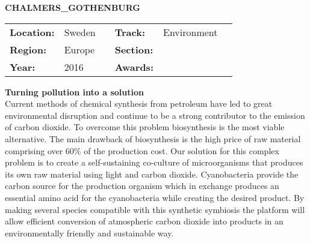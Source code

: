 \textbf{\uppercase{Chalmers\_Gothenburg}} \FloatBarrier \begin{table}[h] \begin{tabular}{lp{2.5cm}llll} \textbf{Location:} & Sweden & \multicolumn{1}{|l}{} & \textbf{Track:}   & Environment \\ \textbf{Region:}   & Europe   & \multicolumn{1}{|l}{} & \textbf{Section:} &  \\ \textbf{Year:}     & 2016   & \multicolumn{1}{|l}{} & \textbf{Awards:}  & \end{tabular} \end{table} \FloatBarrier \noindent\textbf{Turning pollution into a solution} \vspace{.2cm}\\ 
Current methods of chemical synthesis from petroleum have led to great environmental disruption and continue to be a strong contributor to the emission of carbon dioxide. To overcome this problem biosynthesis is the most viable alternative. The main drawback of biosynthesis is the high price of raw material comprising over 60\% of the production cost. Our solution for this complex problem is to create a self-sustaining co-culture of microorganisms that produces its own raw material using light and carbon dioxide. Cyanobacteria provide the carbon source for the production organism which in exchange produces an essential amino acid for the cyanobacteria while creating the desired product. By making several species compatible with this synthetic symbiosis the platform will allow efficient conversion of atmospheric carbon dioxide into products in an environmentally friendly and sustainable way.
\vspace{2cm} $ $
\pagebreak

